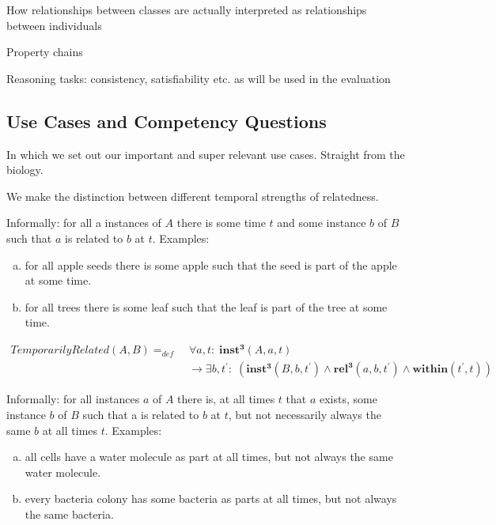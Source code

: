 \documentclass[10pt]{bmc_article}
\newcommand{\mirel}[1]{\ensuremath{\mathrm{\mathbf{#1}}}}
\newcommand{\mclass}[1]{\ensuremath{\mathit{#1}}}
\newcommand{\mrel}[2]{\mirel{#1^#2}}
\newcommand{\mrelt}[1]{\mrel{#1}{3}}
\newenvironment{bmcformat}{\baselineskip20pt\sloppy\setboolean{publ}{false}}{\baselineskip20pt\sloppy}
\begin{document}
\begin{bmcformat}
How relationships between classes are actually interpreted as relationships between individuals

Property chains

Reasoning tasks: consistency, satisfiability etc. as will be used in the evaluation


\subsection*{Use Cases and Competency Questions}

In which we set out our important and super relevant use cases. Straight from the biology. 

We make the distinction between different temporal strengths of relatedness. 


Informally: for all a instances of \mclass{A} there is some time $t$ and some instance $b$ of
\mclass{B} such that $a$ is related to $b$ at $t$. Examples: 
\begin{enumerate}[(a)]
\item for all apple seeds there is
some apple such that the seed is part of the apple at some time. 
\item for all
trees there is some leaf such that the leaf is part of the tree at some time.
\end{enumerate}

\begin{equation}
\begin{split}
\mclass{TemporarilyRelated}(\mclass{A},\mclass{B}) =_{def}&\;
\forall a, t:\; \mrelt{inst}(\mclass{A}, a, t) \\
&\ \rightarrow
\exists b, t^\prime:\;(\mrelt{inst}(\mclass{B},b,t^\prime) \wedge
\mrelt{rel}(a,b,t^\prime) \wedge \mirel{within}(t^\prime,t))
\end{split}
\label{eq:temporarily}
\end{equation}

Informally: for all instances $a$ of \mclass{A} there is, at all times $t$ that
$a$ exists,
some instance $b$ of \mclass{B} such that a is related to $b$ at $t$, but not necessarily
always the same $b$ at all times $t$. Examples:
\begin{enumerate}[(a)]
\item all cells have a water molecule as
part at all times, but not always the same water molecule.
\item every bacteria colony has some bacteria as parts at all times, but not
always the same bacteria.
\end{enumerate}



\end{bmcformat}
\end{document}
